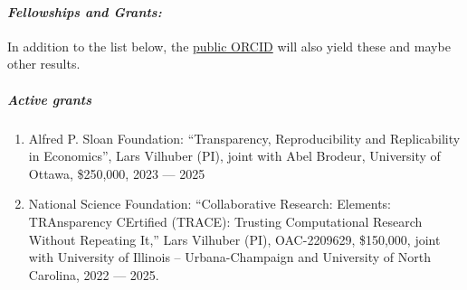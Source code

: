 \documentclass[10pt,letterpaper]{report}
\begin{document}
\paragraph{\it \bf Fellowships and Grants:}
In addition to the list below, the 
\href{http://orcid.org/0000-0001-5733-8932}{public ORCID} will also yield these and maybe other results.
\subparagraph{Active grants}
\begin{enumerate}
  \item Alfred P. Sloan Foundation: ``Transparency, Reproducibility and Replicability in Economics'', Lars Vilhuber (PI), joint with Abel Brodeur, University of Ottawa, \$250,000, 2023 --- 2025
  \item National Science Foundation: ``Collaborative Research: Elements: TRAnsparency CErtified (TRACE): Trusting Computational Research Without Repeating It,'' Lars Vilhuber (PI),  OAC-2209629, \$150,000, joint with University of Illinois -- Urbana-Champaign and University of North Carolina, 2022 --- 2025.
	
\end{enumerate}
\end{document}
